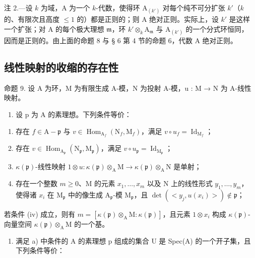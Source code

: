 注 2.—设 \(k\) 为域，A 为一个 \(k\)-代数，使得环 \(\mathrm{A}_{(k')}\) 对每个纯不可分扩张 \(k'\)（\(k\) 的、有限次且高度 \(\leqslant 1\) 的）都是正则的；则 A 绝对正则。实际上，设 \(k'\) 是这样一个扩张；对 A 的每个极大理想 \(\mathfrak{m}\)，环 \(k'\otimes_k\mathrm{A}_{\mathfrak{m}}\) 与 \(\mathrm{A}_{(k')}\) 的一个分式环恒同，因而是正则的。由上面的命题 8 与 § 6 第 4 节的命题 6，代数 A 绝对正则。

\subsection{线性映射的收缩的存在性}

命题 9. 设 A 为环，M 为有限生成 A-模，N 为投射 A-模，u : M → N 为 A-线性映射。

\begin{enumerate}
\def\labelenumi{\alph{enumi})}
\tightlist
\item
  设 p 为 A 的素理想。下列条件等价：
\end{enumerate}

\begin{enumerate}
\def\labelenumi{(\roman{enumi})}
\item
  存在 \(f \in \mathrm{A} - \mathfrak{p}\) 与 \(v \in \operatorname{Hom}_{\mathrm{A}_f}(\mathrm{N}_f, \mathrm{M}_f)\)，满足 \(v \circ u_f = \operatorname{Id}_{\mathrm{M}_f}\)；
\item
  存在 \(v \in \operatorname{Hom}_{\mathrm{A}_{\mathfrak{p}}}(\mathrm{N}_{\mathfrak{p}}, \mathrm{M}_{\mathfrak{p}})\)，满足 \(v \circ u_{\mathfrak{p}} = \operatorname{Id}_{\mathrm{M}_{\mathfrak{p}}}\)；
\item
  \(\kappa(\mathfrak{p})\text{-线性映射 }1 \otimes u : \kappa(\mathfrak{p}) \otimes_{\mathrm{A}} \mathrm{M} \to \kappa(\mathfrak{p}) \otimes_{\mathrm{A}} \mathrm{N}\) 是单射；
\item
  存在一个整数 \(m \geqslant 0\)、M 的元素 \(x_{1}, \ldots, x_{m}\) 以及 N 上的线性形式 \(y_{1}, \ldots, y_{m}\)，使得诸 \(x_{i}\) 在 \(\mathrm{M}_{\mathfrak{p}}\) 中的像生成 \(\mathrm{A}_{\mathfrak{p}}\)-模 \(\mathrm{M}_{\mathfrak{p}}\)，且 \(\det(<y_{j}, u(x_{i})>) \notin \mathfrak{p}\)；
\end{enumerate}

若条件 (iv) 成立，则有 \(m = [\kappa(\mathfrak{p}) \otimes_{\mathrm{A}} \mathrm{M} : \kappa(\mathfrak{p})]\)，且元素 \(1 \otimes x_i\) 构成 \(\kappa(\mathfrak{p})\)-向量空间 \(\kappa(\mathfrak{p}) \otimes_{\mathrm{A}} \mathrm{M}\) 的一个基。

\begin{enumerate}
\def\labelenumi{\alph{enumi})}
\setcounter{enumi}{1}
\tightlist
\item
  满足 a) 中条件的 A 的素理想 p 组成的集合 U 是 Spec(A) 的一个开子集，且下列条件等价：
\end{enumerate}

